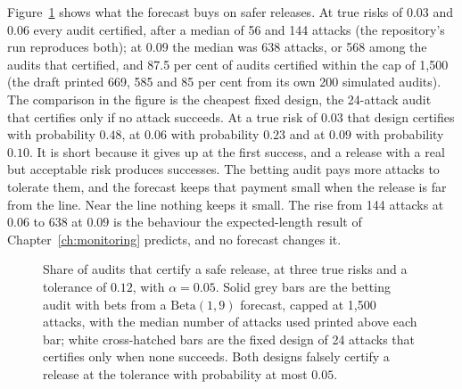 Figure~\ref{c22:fig-audit} shows what the forecast buys on safer releases. At true risks of $0.03$ and $0.06$
every audit certified, after a median of 56 and 144 attacks (the repository's run reproduces both); at $0.09$ the median was 638
attacks, or 568 among the audits that certified, and 87.5 per cent of audits certified within the cap of 1,500 (the draft
printed 669, 585 and 85 per cent from its own 200 simulated audits). The comparison in the figure is the cheapest fixed design, the 24-attack audit that
certifies only if no attack succeeds. At a true risk of $0.03$ that design certifies with probability
$0.48$, at $0.06$ with probability $0.23$ and at $0.09$ with probability $0.10$. It is short because it gives
up at the first success, and a release with a real but acceptable risk produces successes. The
betting audit pays more attacks to tolerate them, and the forecast keeps that payment small when
the release is far from the line. Near the line nothing keeps it small. The rise from 144 attacks
at $0.06$ to 638 at $0.09$ is the behaviour the expected-length result of Chapter~\ref{ch:monitoring} predicts, and no
forecast changes it.

\begin{figure}[ht]
\centering
{}
\caption{Share of audits that certify a safe release, at three true risks and a tolerance of $0.12$, with
$\alpha=0.05$. Solid grey bars are the betting audit with bets from a $\mathrm{Beta}(1,9)$ forecast, capped at 1,500
attacks, with the median number of attacks used printed above each bar; white cross-hatched bars are
the fixed design of 24 attacks that certifies only when none succeeds. Both designs falsely certify a
release at the tolerance with probability at most $0.05$.}
\label{c22:fig-audit}
\end{figure}

